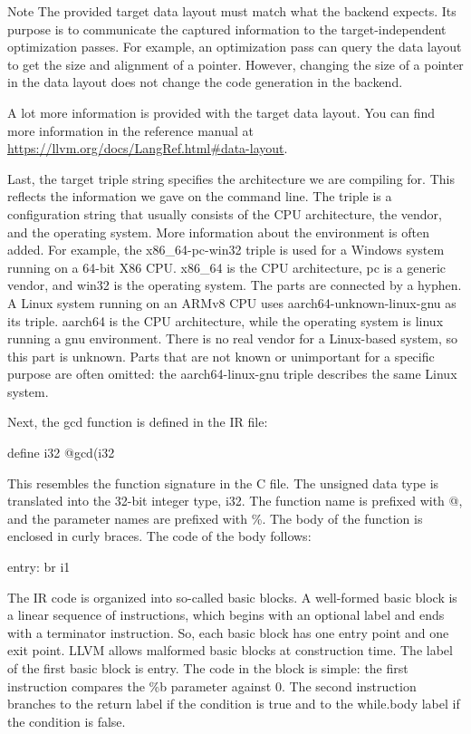 \begin{myNotic}{Note}
The provided target data layout must match what the backend expects. Its purpose is to communicate the captured information to the target-independent optimization passes. For example, an optimization pass can query the data layout to get the size and alignment of a pointer. However, changing the size of a pointer in the data layout does not change the code generation in the backend.

A lot more information is provided with the target data layout. You can find more information in the reference manual at \url{https://llvm.org/docs/LangRef.html#data-layout}.
\end{myNotic}

Last, the target triple string specifies the architecture we are compiling for. This reflects the information we gave on the command line. The triple is a configuration string that usually consists of the CPU architecture, the vendor, and the operating system. More information about the environment is often added. For example, the x86\_64-pc-win32 triple is used for a Windows system running on a 64-bit X86 CPU. x86\_64 is the CPU architecture, pc is a generic vendor, and win32 is the operating system. The parts are connected by a hyphen. A Linux system running on an ARMv8 CPU uses aarch64-unknown-linux-gnu as its triple. aarch64 is the CPU architecture, while the operating system is linux running a gnu environment. There is no real vendor for a Linux-based system, so this part is unknown. Parts that are not known or unimportant for a specific purpose are often omitted: the aarch64-linux-gnu triple describes the same Linux system.

Next, the gcd function is defined in the IR file:

\begin{shell}
define i32 @gcd(i32 %
\end{shell}

This resembles the function signature in the C file. The unsigned data type is translated into the 32-bit integer type, i32. The function name is prefixed with @, and the parameter names are prefixed with \%. The body of the function is enclosed in curly braces. The code of the body follows:

\begin{shell}
entry:
    br i1 %
\end{shell}

The IR code is organized into so-called basic blocks. A well-formed basic block is a linear sequence of instructions, which begins with an optional label and ends with a terminator instruction. So, each basic block has one entry point and one exit point. LLVM allows malformed basic blocks at construction time. The label of the first basic block is entry. The code in the block is simple: the first instruction compares the \%b parameter against 0. The second instruction branches to the return label if the condition is true and to the while.body label if the condition is false.

